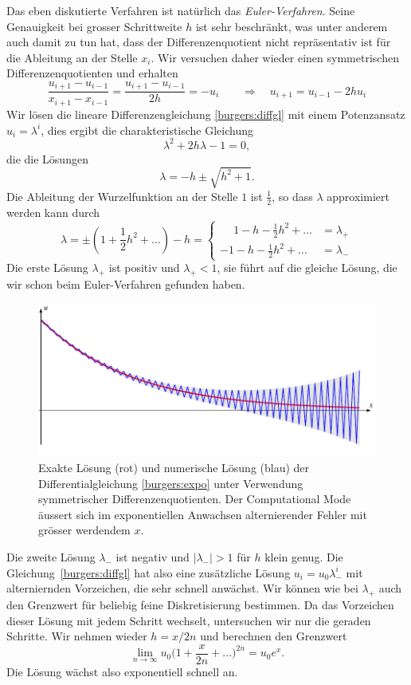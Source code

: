 Das eben diskutierte Verfahren ist natürlich das {\em Euler-Verfahren}.
Seine Genauigkeit bei grosser Schrittweite $h$ ist sehr beschränkt,
was unter anderem auch damit zu tun hat, dass der Differenzenquotient
nicht repräsentativ ist für die Ableitung an der Stelle $x_i$.
Wir versuchen daher wieder einen symmetrischen Differenzenquotienten
und erhalten
\begin{equation}
\frac{u_{i+1}-u_{i-1}}{x_{i+1}-x_{i-1}}
=
\frac{u_{i+1}-u_{i-1}}{2h}
=
-u_{i}
\qquad\Rightarrow\quad
u_{i+1}=u_{i-1}-2hu_{i}
\label{burgers:diffgl}
\end{equation}
Wir lösen die lineare Differenzengleichung \eqref{burgers:diffgl} mit einem
Potenzansatz $u_i=\lambda^i$, dies ergibt die charakteristische Gleichung
\[
\lambda^2+2h\lambda-1=0,
\]
die die Lösungen
\[
\lambda = -h\pm\sqrt{h^2+1}.
\]
Die Ableitung der Wurzelfunktion an der Stelle $1$ ist $\frac12$, so dass
$\lambda$ approximiert werden kann durch
\[
\lambda = \pm(1+\frac12h^2+\dots)- h
=
\begin{cases}
\phantom{-}1-h-\frac12h^2+\dots&=\lambda_+\\
-1-h-\frac12h^2+\dots&=\lambda_-
\end{cases}
\]
Die erste Lösung $\lambda_+$ ist positiv und $\lambda_+<1$, sie führt auf
die gleiche Lösung, die wir schon beim Euler-Verfahren gefunden haben.
\begin{figure}
\centering
\includegraphics{learning/compmod.pdf}
\caption{Exakte Lösung (rot) und numerische Lösung (blau)
der Differentialgleichung
\eqref{burgers:expo}
unter Verwendung symmetrischer Differenzenquotienten.
Der Computational Mode äussert sich im exponentiellen Anwachsen
alternierender Fehler mit grösser werdendem $x$.
\label{burgers:compmod}}
\end{figure}

Die zweite Lösung $\lambda_-$ ist negativ und $|\lambda_-|>1$ für $h$
klein genug.
Die Gleichung~\ref{burgers:diffgl} hat also eine zusätzliche Lösung
$u_i=u_0\lambda_-^i$ mit alterniernden Vorzeichen, die sehr schnell anwächst.
Wir können wie bei $\lambda_+$ auch den Grenzwert für beliebig feine
Diskretisierung bestimmen.
Da das Vorzeichen dieser Lösung mit jedem Schritt wechselt, untersuchen
wir nur die geraden Schritte.
Wir nehmen wieder $h=x/2n$ und berechnen den Grenzwert
\[
\lim_{n\to\infty}
u_0
\biggl(
1+\frac{x}{2n}+\dots
\biggr)^{2n}
=
u_0e^x.
\]
Die Lösung wächst also exponentiell schnell an.


